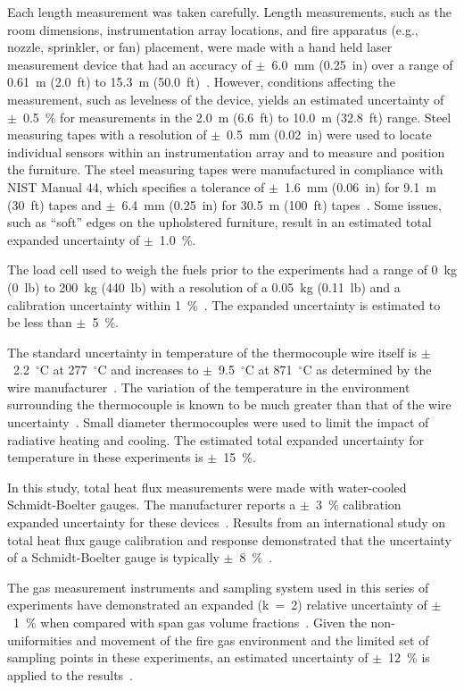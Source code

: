 \documentclass[12pt,oneside]{book}
\begin{document}
Each length measurement was taken carefully. Length measurements, such as the room dimensions, instrumentation array locations, and fire apparatus (e.g., nozzle, sprinkler, or fan) placement, were made with a hand held laser measurement device that had an accuracy of $\pm$~6.0~mm (0.25~in) over a range of 0.61~m (2.0~ft) to 15.3~m (50.0~ft)~\cite{StanleyTools}. However, conditions affecting the measurement, such as levelness of the device, yields an estimated uncertainty of $\pm$~0.5~\% for measurements in the 2.0~m (6.6~ft) to 10.0~m (32.8~ft) range.  Steel measuring tapes with a resolution of  $\pm$~0.5~mm (0.02~in) were used to locate individual sensors within an instrumentation array and to measure and position the furniture. The steel measuring tapes were manufactured in compliance with NIST Manual 44, which specifies a tolerance of $\pm$~1.6~mm (0.06~in) for 9.1~m (30~ft) tapes and $\pm$~6.4~mm (0.25~in) for 30.5~m (100~ft) tapes~\cite{Butcher:2012}. Some issues, such as ``soft'' edges on the upholstered furniture, result in an estimated total expanded uncertainty of $\pm$~1.0~\%.

The load cell used to weigh the fuels prior to the experiments had a range of 0~kg (0~lb) to 200~kg (440~lb) with a resolution of a 0.05~kg (0.11~lb) and a calibration uncertainty within 1~\%~\cite{Ohaus:2000}. The expanded uncertainty is estimated to be less than $\pm$~5~\%.

The standard uncertainty in temperature of the thermocouple wire itself is $\pm$~2.2~$^{\circ}$C at 277~$^{\circ}$C and increases to $\pm$~9.5~$^{\circ}$C at 871~$^{\circ}$C as determined by the wire manufacturer~\cite{Omega:2004}. The variation of the temperature in the environment surrounding the thermocouple is known to be much greater than that of the wire uncertainty~\cite{Blevins:1999,Pitts:2003}. Small diameter thermocouples were used to limit the impact of radiative heating and cooling. The estimated total expanded uncertainty for temperature in these experiments is $\pm$~15~\%.

In this study, total heat flux measurements were made with water-cooled Schmidt-Boelter gauges. The manufacturer reports a $\pm$~3~\% calibration expanded uncertainty for these devices~\cite{Medtherm:2003}. Results from an international study on total heat flux gauge calibration and response demonstrated that the uncertainty of a Schmidt-Boelter gauge is typically $\pm$~8~\%~\cite{Pitts:2006}.

The gas measurement instruments and sampling system used in this series of experiments have demonstrated an expanded (k~=~2) relative uncertainty of $\pm$~1~\% when compared with span gas volume fractions~\cite{Bundy:2007}. Given the non-uniformities and movement of the fire gas environment and the limited set of sampling points in these experiments, an estimated uncertainty of $\pm$~12~\% is applied to the results~\cite{Lock:1}.
\end{document}
